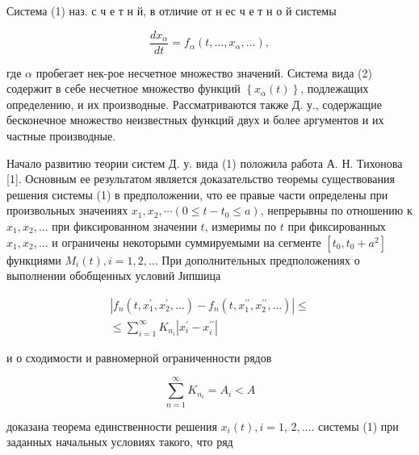 \documentclass[10pt]{article}
\begin{document}
Система (1) наз. с ч е т н й, в отличие от н ес ч е т н о й системы



\[

\frac{d x_{\alpha}}{d t}=f_{\alpha}\left(t, \ldots, x_{\alpha}, \ldots\right),

\]



где $\alpha$ пробегает нек-рое несчетное множество значений. Система вида (2) содержит в себе несчетное множество функций $\left\{x_{\alpha}(t)\right\}$, подлежащих определению, и их производные. Рассматриваются также Д. у., содержащие бесконечное множество неизвестных функций двух и более аргументов и их частные производные.



Начало развитию теории систем Д. у. вида (1) положила работа А. Н. Тихонова [1]. Основным ее результатом является доказательство теоремы существования решения системы (1) в предположении, что ее правые части определены при произвольных значениях $x_{1}, x_{2}, \cdots\left(0 \leqslant t-t_{0} \leqslant a\right)$, непрерывны по отношению к $x_{1}, x_{2}, \ldots$ при фиксированном значении $t$, измеримы по $t$ при фиксированных $x_{1}, x_{2}, \ldots$ и ограничены некоторыми суммируемыми на сегменте $\left[t_{0}, t_{0}+a^{2}\right]$ функциями $M_{i}(t), i=1,2, \ldots$ При дополнительных предположениях о выполнении обобщенных условий Јипшица



\[

\begin{gathered}

\left|f_{n}\left(t, x_{1}^{\prime}, x_{2}^{\prime}, \ldots\right)-f_{n}\left(t, x_{1}^{\prime \prime}, x_{2}^{\prime \prime}, \ldots\right)\right| \leqslant \\

\leqslant \sum_{i=1}^{\infty} K_{n_{i}}\left|x_{i}^{\prime}-x_{i}^{\prime \prime}\right|

\end{gathered}

\]



и о сходимости и равномерной ограниченности рядов



\[

\sum_{n=1}^{\infty} K_{n_{i}}=A_{i}<A

\]



доказана теорема единственности решения $x_{i}(t), i=1$, $2, \ldots$. системы (1) при заданных начальных условиях такого, что ряд
\end{document}
